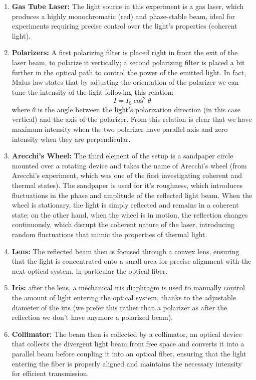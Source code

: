 \documentclass[prl,twocolumn]{revtex4-1}
\begin{document}
\begin{enumerate}
    \item \textbf{Gas Tube Laser:} The light source in this experiment is a gas laser, which produces a highly monochromatic (red) and phase-stable beam, ideal for experiments requiring precise control over the light’s properties (coherent light).
    \item \textbf{Polarizers:} A first polarizing filter is placed right in front the exit of the laser beam, to polarize it vertically; a second polarizing filter is placed a bit further in the optical path to control the power of the emitted light. In fact, Malus law states that by adjusting the orientation of the polarizer we can tune the intensity of the light following this relation:
    \begin{equation}
        I = I_0 \cos^2{\theta}
    \end{equation}
    where $\theta$ is the angle between the light's polarization direction (in this case vertical) and the axis of the polarizer. From this relation is clear that we have maximum intensity when the two polarizer have parallel axis and zero intensity when they are perpendicular.
    \item \textbf{Arecchi's Wheel:} The third element of the setup is a sandpaper circle mounted over a rotating device and takes the name of Arecchi's wheel (from Arecchi's experiment, which was one of the first investigating coherent and thermal states). The sandpaper is used for it's roughness, which  introduces fluctuations in the phase and amplitude of the reflected light beam. When the wheel is stationary, the light is simply reflected and remains in a coherent state; on the other hand, when the wheel is in motion, the reflection changes continuously, which disrupt the coherent nature of the laser, introducing random fluctuations that mimic the properties of thermal light.
    \item \textbf{Lens:} The reflected beam then is focused through a convex lens, ensuring that the light is concentrated onto a small area for precise alignment with the next optical system, in particular the optical fiber.
    \item \textbf{Iris:} after the lens, a mechanical iris diaphragm is used to manually control the amount of light entering the optical system, thanks to the adjustable diameter of the iris (we prefer this rather than a polarizer as after the reflection we don't have anymore a polarized beam).
    \item \textbf{Collimator:} The beam then is collected by a collimator, an optical device that collects the divergent light beam from free space and converts it into a parallel beam before coupling it into an optical fiber, ensuring that the light entering the fiber is properly aligned and maintains the necessary intensity for efficient transmission.

\end{enumerate}
\end{document}

